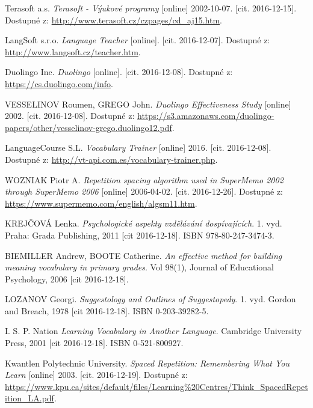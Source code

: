 \documentclass[a4paper,11pt,titlepage,fleqn]{article}
\begin{document}
\newpage
\begin{thebibliography}{99}
    

        Terasoft a.s. \textit{Terasoft - Výukové programy} [online] 2002-10-07. [cit. 2016-12-15]. Dostupné z: \url{http://www.terasoft.cz/czpages/cd_aj15.htm}.
    
        LangSoft s.r.o. \textit{Language Teacher} [online]. [cit. 2016-12-07]. Dostupné z: \url{http://www.langsoft.cz/teacher.htm}.

        Duolingo Inc. \textit{Duolingo} [online]. [cit. 2016-12-08]. Dostupné z: \url{https://cs.duolingo.com/info}.

        VESSELINOV Roumen, GREGO John. \textit{Duolingo Effectiveness Study} [online] 2002. [cit. 2016-12-08]. Dostupné z: \url{https://s3.amazonaws.com/duolingo-papers/other/vesselinov-grego.duolingo12.pdf}.

        LanguageCourse S.L. \textit{Vocabulary Trainer} [online] 2016. [cit. 2016-12-08]. Dostupné z: \url{http://vt-api.com.es/vocabulary-trainer.php}.

        WOZNIAK Piotr A. \textit{Repetition spacing algorithm used in SuperMemo 2002 through SuperMemo 2006} [online] 2006-04-02. [cit. 2016-12-26]. Dostupné z: \url{https://www.supermemo.com/english/algsm11.htm}.

        KREJČOVÁ Lenka. \textit{Psychologické aspekty vzdělávání dospívajících}. 1. vyd. Praha: Grada Publishing, 2011 [cit 2016-12-18]. ISBN 978-80-247-3474-3.

        BIEMILLER Andrew, BOOTE Catherine. \textit{An effective method for building meaning vocabulary in primary grades}. Vol 98(1), Journal of Educational Psychology, 2006 [cit 2016-12-18].

        LOZANOV Georgi. \textit{Suggestology and Outlines of Suggestopedy}. 1. vyd. Gordon and Breach, 1978 [cit 2016-12-18]. ISBN 0-203-39282-5.

        I. S. P. Nation \textit{Learning Vocabulary in Another Language}. Cambridge University Press, 2001 [cit 2016-12-18]. ISBN 0-521-800927.

        Kwantlen Polytechnic University. \textit{Spaced Repetition: Remembering What You Learn} [online] 2003. [cit. 2016-12-19]. Dostupné z: \url{https://www.kpu.ca/sites/default/files/Learning%20Centres/Think_SpacedRepetition_LA.pdf}.


\end{thebibliography}
\end{document}
